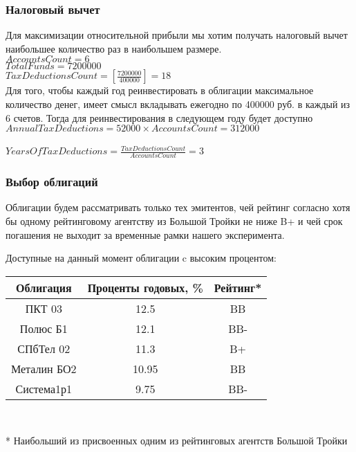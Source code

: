 \subsubsection{Налоговый вычет}
Для максимизации относительной прибыли мы хотим получать налоговый вычет наибольшее количество раз в наибольшем размере.\\
$AccountsCount = 6$\\
$TotalFunds = 7 200 000$\\
$TaxDeductionsCount = \left[\displaystyle{\frac{7 200 000}{400 000}}\right] = 18$\\
Для того, чтобы каждый год реинвестировать в облигации максимальное количество денег, имеет смысл вкладывать ежегодно по 400000 руб. в каждый из 6 счетов. Тогда для реинвестирования в следующем году будет доступно\\
$AnnualTaxDeductions = 52 000 \times AccountsCount = 312 000$\\
\\
$YearsOfTaxDeductions = \displaystyle{\frac{TaxDeductionsCount}{AccountsCount}} = 3$
\subsubsection{Выбор облигаций}
Облигации будем рассматривать только тех эмитентов, чей рейтинг согласно хотя бы одному рейтинговому агентству из Большой Тройки  не ниже B+ и чей срок погашения не выходит за временные рамки нашего эксперимента.

Доступные на данный момент облигации c высоким процентом:

\begin{tabular}{|c|c|c|}
    \hline
    Облигация & Проценты годовых, \%& Рейтинг*\\
    \hline
    ПКТ 03    & 12.5                &  BB     \\
    \hline
    Полюс Б1  & 12.1                &  BB-    \\
    \hline
    СПбТел 02   & 11.3              &  B+     \\
    \hline
    Металин БО2 & 10.95             &  BB     \\
    \hline
    Система1р1  & 9.75              &  BB-    \\
    \hline
\end{tabular}\\
\begin{footnotesize}
    * Наибольший из присвоенных одним из рейтинговых агентств Большой Тройки
\end{footnotesize}\\

